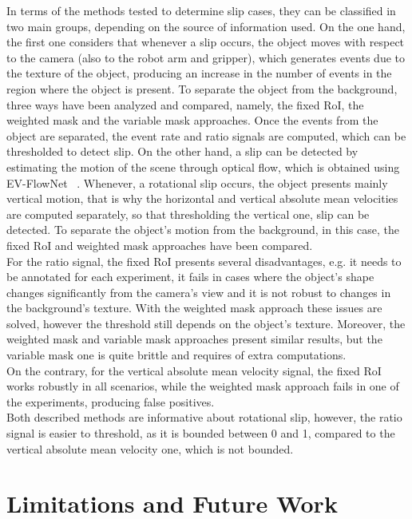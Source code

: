 In terms of the methods tested to determine slip cases, they can be classified in two main groups, depending on the source of information used. On the one hand, the first one considers that whenever a slip occurs, the object moves with respect to the camera (also to the robot arm and gripper), which generates events due to the texture of the object, producing an increase in the number of events in the region where the object is present. To separate the object from the background, three ways have been analyzed and compared, namely, the fixed RoI, the weighted mask and the variable mask approaches. Once the events from the object are separated, the event rate and ratio signals are computed, which can be thresholded to detect slip. On the other hand, a slip can be detected by estimating the motion of the scene through optical flow, which is obtained using EV-FlowNet ~\cite{evflownet}. Whenever, a rotational slip occurs, the object presents mainly vertical motion, that is why the horizontal and vertical absolute mean velocities are computed separately, so that thresholding the vertical one, slip can be detected. To separate the object's motion from the background, in this case, the fixed RoI and weighted mask approaches have been compared.\\

For the ratio signal, the fixed RoI presents several disadvantages, e.g. it needs to be annotated for each experiment, it fails in cases where the object's shape changes significantly from the camera's view and it is not robust to changes in the background's texture. With the weighted mask approach these issues are solved, however the threshold still depends on the object's texture. Moreover, the weighted mask and variable mask approaches present similar results, but the variable mask one is quite brittle and requires of extra computations.\\

On the contrary, for the vertical absolute mean velocity signal, the fixed RoI works robustly in all scenarios, while the weighted mask approach fails in one of the experiments, producing false positives.\\

Both described methods are informative about rotational slip, however, the ratio signal is easier to threshold, as it is bounded between 0 and 1, compared to the vertical absolute mean velocity one, which is not bounded.

\section{Limitations and Future Work}

